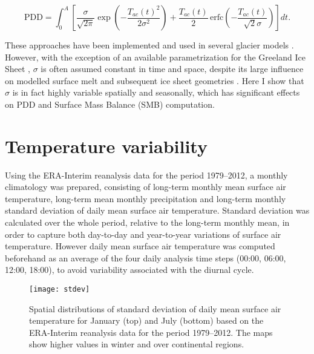 \documentclass[review]{igs}
\begin{document}
\begin{equation} \label{eq:calovgreve}
  \mathrm{PDD} = \int_{0}^{A} \left[
    \frac{\sigma}{\sqrt{2\pi}}
    \exp\left({-\frac{T_{ac}(t)^2}{2\sigma^2}}\right)
    +\frac{T_{ac}(t)}{2} \,
    \mathrm{erfc} \left(-\frac{T_{ac}(t)}{\sqrt{2}\sigma}\right)
  \right]dt.
\end{equation}

These approaches have been implemented and used in several glacier models \citep[e.g.][]{letreguilly-etal-1991,greve-1997,seddik-etal-2012,charbit-etal-2013}. However, with the exception of an available parametrization for the Greeland Ice Sheet \citep{fausto-etal-2011}, $\sigma$ is often assumed constant in time and space, despite its large influence on modelled surface melt and subsequent ice sheet geometries \citep{charbit-etal-2013}. Here I show that $\sigma$ is in fact highly variable spatially and seasonally, which has significant effects on PDD and Surface Mass Balance (SMB) computation.


\section{Temperature variability}

Using the ERA-Interim reanalysis data \citep{data:erai} for the period 1979--2012, a monthly climatology was prepared, consisting of long-term monthly mean surface air temperature, long-term mean monthly precipitation and long-term monthly standard deviation of daily mean surface air temperature. Standard deviation was calculated over the whole period, relative to the long-term monthly mean, in order to capture both day-to-day and year-to-year variations of surface air temperature. However daily mean surface air temperature was computed beforehand as an average of the four daily analysis time steps (00:00, 06:00, 12:00, 18:00), to avoid variability associated with the diurnal cycle.

\begin{figure}
  \centering\texttt{[image: stdev]}
  \caption{Spatial distributions of standard deviation of daily mean surface air temperature for January (top) and July (bottom) based on the ERA-Interim reanalysis \citep{data:erai} data for the period 1979--2012. The maps show higher values in winter and over continental regions.}
  \label{fig:stdev}
\end{figure}
\end{document}
